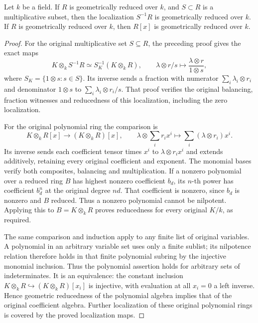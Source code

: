 \begin{lemma}
\label{editorial-source-lemma-geometrically-reduced-permanence}
Let $k$ be a field.
If $R$ is geometrically reduced over $k$,
and $S \subset R$ is a multiplicative subset, then the localization
$S^{-1}R$ is geometrically reduced over $k$.
If $R$ is geometrically reduced over $k$, then $R[x]$ is geometrically
reduced over $k$.
\end{lemma}

\begin{proof}
For the original multiplicative set $S\subseteq R$,
the preceding proof gives the exact maps
$$
K\otimes_kS^{-1}R\simeq
S_K^{-1}(K\otimes_kR),\qquad
\lambda\otimes r/s\longmapsto
\frac{\lambda\otimes r}{1\otimes s},
$$
where $S_K=\{1\otimes s:s\in S\}$.
Its inverse sends a fraction with numerator
$\sum_i\lambda_i\otimes r_i$ and denominator
$1\otimes s$ to $\sum_i\lambda_i\otimes r_i/s$.
That proof verifies the original balancing,
fraction witnesses and reducedness of this
localization, including the zero localization.

For the original polynomial ring the comparison is
$$
K\otimes_kR[x]\longrightarrow(K\otimes_kR)[x],
\qquad \lambda\otimes\sum_i r_i x^i
\longmapsto\sum_i(\lambda\otimes r_i)x^i.
$$
Its inverse sends each coefficient tensor
times $x^i$ to $\lambda\otimes r_i x^i$
and extends additively, retaining every
original coefficient and exponent. The
monomial bases verify both composites,
balancing and multiplication.
If a nonzero polynomial over a reduced
ring $B$ has highest nonzero coefficient
$b_d$, its $n$-th power has coefficient
$b_d^n$ at the original degree $nd$.
That coefficient is nonzero, since $b_d$
is nonzero and $B$ reduced. Thus a nonzero
polynomial cannot be nilpotent. Applying
this to $B=K\otimes_kR$ proves reducedness
for every original $K/k$, as required.

The same comparison and induction apply
to any finite list of original variables.
A polynomial in an arbitrary variable
set uses only a finite sublist; its
nilpotence relation therefore holds in
that finite polynomial subring by the
injective monomial inclusion. Thus the
polynomial assertion holds for arbitrary
sets of indeterminates. It is an equivalence:
the constant inclusion
$K\otimes_kR\hookrightarrow(K\otimes_kR)[x_i]$
is injective, with evaluation at all
$x_i=0$ a left inverse. Hence geometric
reducedness of the polynomial algebra
implies that of the original coefficient
algebra. Further localization of these
original polynomial rings is covered
by the proved localization maps.
\end{proof}

